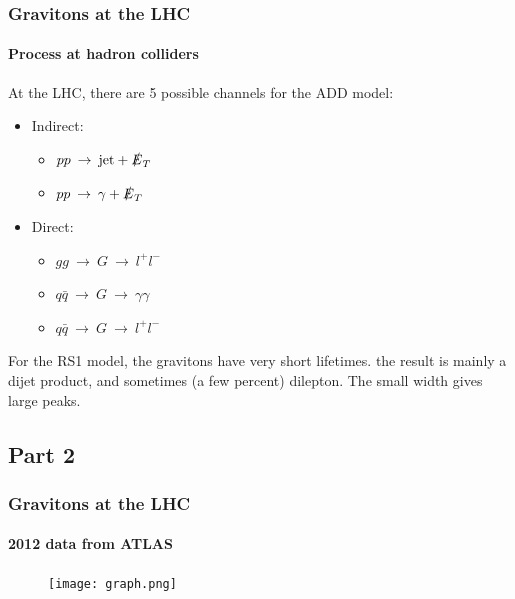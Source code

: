\documentclass[10pt]{beamer}
\begin{document}
	\begin{frame}
		\frametitle{Gravitons at the LHC}
		\framesubtitle{Process at hadron colliders}
		At the LHC, there are 5 possible channels for the ADD model:
		\begin{itemize}
			\item Indirect:
			\begin{itemize}
				\item $pp\:\rightarrow\: \text{jet} + \slashed E_T$
				\item $pp\:\rightarrow\: \gamma + \slashed E_T$
			\end{itemize}
			\item Direct:
			\begin{itemize}
				\item $gg\:\rightarrow\: G \:\rightarrow\: l^+l^-$
				\item $q\bar{q}\:\rightarrow\: G \:\rightarrow\: \gamma\gamma$
				\item $q\bar{q}\:\rightarrow\: G \:\rightarrow\: l^+l^-$
			\end{itemize}
		\end{itemize}
		
		For the RS1 model, the gravitons have very short lifetimes. the result is mainly a dijet product, and sometimes (a few percent) dilepton. The small width gives large peaks.
		
	\end{frame}
	
	\subsection{Part 2}
	\begin{frame}
		\frametitle{Gravitons at the LHC}
		\framesubtitle{2012 data from ATLAS}
		\begin{figure}[H]
			\centering
			\texttt{[image: graph.png]}
			\end{figure}
	\end{frame}
	
\end{document}
